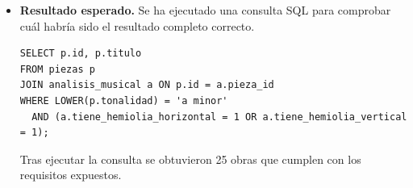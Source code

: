 \begin{itemize}
*   **The Humours of Mullin-a-Faunia** (Compás: 6/8)
*   **The Rakes of Clonmel** (Compás: 6/8)
*   **A Stor Mo Chroi** (Compás: 3/4)
*   **Peg Ghlégeal Ní Mhurchadh** (Compás: 3/4)
*   **Fiagaidhe an Chúil Bháin** (Compás: 3/4)
*   **51. LOS PÁJAROS** (Autor: Castelvi, Compás: 6/8)
*   **Partitura sin título** (Autor: Compositor / arreglista, Compás: 3/4)
*   **The Rakes of Clonmel** (Autor: Compositor / arreglista, Compás: 6/8)
*   **A Stor Mo Chroi** (Autor: Compositor / arreglista, Compás: 3/4)
*   **Peg Ghlégeal Ní Mhurchadh** (Compás: 3/4)"
\item \textbf{Resultado esperado.} Se ha ejecutado una consulta SQL para comprobar cuál habría sido el resultado completo correcto.
    \begin{verbatim}
SELECT p.id, p.titulo
FROM piezas p
JOIN analisis_musical a ON p.id = a.pieza_id
WHERE LOWER(p.tonalidad) = 'a minor'
  AND (a.tiene_hemiolia_horizontal = 1 OR a.tiene_hemiolia_vertical = 1);
    \end{verbatim}    
    Tras ejecutar la consulta se obtuvieron 25 obras que cumplen con los requisitos expuestos.

\end{itemize}

